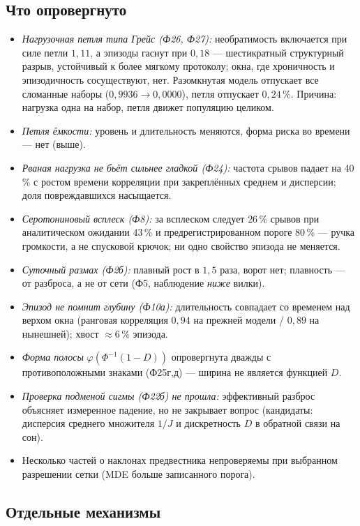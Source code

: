 \documentclass[11pt,a4paper]{article}
\theoremstyle{remark}
\begin{document}
\subsection{Что опровергнуто}\label{sec:failed}
\begin{itemize}
\item \emph{Нагрузочная петля типа Грейс (Ф26, Ф27):} необратимость включается при
силе петли $1{,}11$, а эпизоды гаснут при $0{,}18$ --- шестикратный структурный
разрыв, устойчивый к более мягкому протоколу; окна, где хроничность и эпизодичность
сосуществуют, нет. Разомкнутая модель отпускает все сломанные наборы
($0{,}9936\to0{,}0000$), петля отпускает $0{,}24$\,\%. Причина: нагрузка одна на
набор, петля движет популяцию целиком.
\item \emph{Петля ёмкости:} уровень и длительность меняются, форма риска во времени
--- нет (выше).
\item \emph{Рваная нагрузка не бьёт сильнее гладкой (Ф24):} частота срывов падает на
40\,\% с ростом времени корреляции при закреплённых среднем и дисперсии; доля
повреждавшихся насыщается.
\item \emph{Серотониновый всплеск (Ф8):} за всплеском следует $26$\,\% срывов при
аналитическом ожидании $43$\,\% и предрегистрированном пороге $80$\,\% --- ручка громкости,
а не спусковой крючок; ни одно свойство эпизода не меняется.
\item \emph{Суточный размах (Ф2б):} плавный рост в $1{,}5$ раза, ворот нет; плавность
--- от разброса, а не от сети (Ф5, наблюдение \emph{ниже} вилки).
\item \emph{Эпизод не помнит глубину (Ф10а):} длительность совпадает со временем над верхом
окна (ранговая корреляция $0{,}94$ на прежней модели / $0{,}89$ на нынешней); хвост
$\approx6$\,\% эпизода.
\item \emph{Форма полосы} $\varphi(\Phi^{-1}(1-D))$ опровергнута дважды с
противоположными знаками (Ф25г,д) --- ширина не является функцией $D$.
\item \emph{Проверка подменой сигмы (Ф22б) не прошла:} эффективный разброс объясняет
измеренное падение, но не закрывает вопрос (кандидаты: дисперсия среднего множителя
$1/J$ и дискретность $D$ в обратной связи на сон).
\item Несколько частей о наклонах предвестника непроверяемы при выбранном разрешении
сетки (MDE больше записанного порога).
\end{itemize}

\subsection{Отдельные механизмы}\label{sec:selected}
\end{document}
